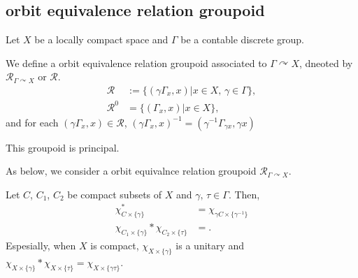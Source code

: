 \subsection{orbit equivalence relation groupoid}
Let $X$ be a locally compact space and $\Gamma$ be a contable discrete group.
\begin{definition}
  We define a orbit equivalence relation groupoid associated to $\Gamma \curvearrowright X$, dneoted by $\mathcal{R}_{\Gamma \curvearrowright X}$ or $\mathcal{R}$.
  \begin{align*}
    \mathcal{R} &:= \{(\gamma \Gamma_x,x) | x \in X, \, \gamma \in \Gamma\},\\
    \mathcal{R}^{0} &= \{(\Gamma_x,x) | x \in X\},
  \end{align*}
  and for each $(\gamma \Gamma_x,x) \in \mathcal{R}$, $(\gamma \Gamma_x,x)^{-1} = (\gamma^{-1} \Gamma_{\gamma x},\gamma x)$
\end{definition}
\begin{remark}
  This groupoid is principal.
\end{remark}

As below, we consider a orbit equivalnce relation groupoid $\mathcal{R}_{\Gamma \curvearrowright X}$.
\begin{lemma}
  Let $C$, $C_1$, $C_2$ be compact subsets of $X$ and $\gamma,\,\tau  \in \Gamma$.
  Then,
  \begin{align*}
    \chi_{C\times \{\gamma\}}^* &= \chi_{\gamma C \times \{\gamma^{-1}\}}\\
    \chi_{C_1 \times \{\gamma\}}* \chi_{C_2 \times \{\tau\}} &= .
  \end{align*}
  Espesially, when $X$ is compact,
  $\chi_{X \times \{\gamma\}}$ is a unitary and $\chi_{X \times \{\gamma\}} * \chi_{X\times \{\tau\}} = \chi_{X\times \{\gamma\tau\}}$.
\end{lemma}

